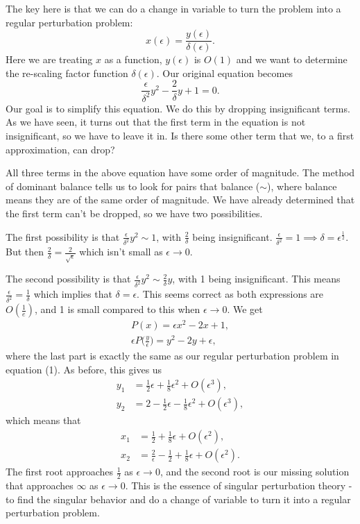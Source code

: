 \documentclass[12pt]{article}
\begin{document}
The key here is that we can do a change in variable to turn the
problem into a regular perturbation problem:
\begin{equation}
x(\epsilon) = \frac{y(\epsilon)}{\delta(\epsilon)}.
\end{equation}
Here we are treating $x$ as a function, $y(\epsilon)$ is $O(1)$ and we want to
determine the re-scaling factor function $\delta(\epsilon)$. Our original
equation becomes
\begin{equation}
\frac{\epsilon}{\delta^2} y^2 - \frac{2}{\delta} y + 1 = 0.
\end{equation}
Our goal is to simplify this equation. We do this by dropping
insignificant terms. As we have seen, it turns out that the first term
in the equation is not insignificant, so we have to leave it in. Is
there some other term that we, to a first approximation, can drop?

All three terms in the above equation have some order of
magnitude. The method of dominant balance tells us to look for pairs
that balance ($\sim$), where balance means they are of the same order
of magnitude. We have already determined that the first term can't be
dropped, so we have two possibilities.

The first possibility is that $\frac{\epsilon}{\delta^2} y^2 \sim 1$,
with $\frac{2}{\delta}$ being insignificant.
$\frac{\epsilon}{\delta^2} = 1 \implies \delta =
\epsilon^{\frac{1}{2}}$.
But then $\frac{2}{\delta} = \frac{2}{\sqrt{\epsilon}}$ which isn't
small as $\epsilon \to 0$.

The second possibility is that
$\frac{\epsilon}{\delta^2} y^2 \sim \frac{2}{\delta} y$, with 1 being
insignificant. This means
$\frac{\epsilon}{\delta^2} = \frac{1}{\delta}$ which implies that
$\delta = \epsilon$. This seems correct as both expressions are
$O(\frac{1}{e})$, and 1 is small compared to this when
$\epsilon \to 0$. We get
\begin{align}
P(x) = \epsilon x^2 - 2x + 1, \\
\epsilon P\Big(\frac{y}{\epsilon}\Big) = y^2 - 2 y + \epsilon,
\end{align}
where the last part is exactly the same as our regular perturbation
problem in equation (1). As before, this gives us
\begin{align}
y_1 &= \frac{1}{2} \epsilon + \frac{1}{8} \epsilon^2 + O(\epsilon^3), \\
y_2 &= 2 - \frac{1}{2} \epsilon - \frac{1}{8} \epsilon^2 + O(\epsilon^3),
\end{align}
which means that
\begin{align}
x_1 &= \frac{1}{2} + \frac{1}{8} \epsilon + O(\epsilon^2), \\
x_2 &= \frac{2}{\epsilon} - \frac{1}{2} + \frac{1}{8} \epsilon + O(\epsilon^2).
\end{align}
The first root approaches $\frac{1}{2}$ as $\epsilon \to 0$, and the
second root is our missing solution that approaches $\infty$ as
$\epsilon \to 0$. This is the essence of singular perturbation theory
- to find the singular behavior and do a change of variable to turn it
into a regular perturbation problem.
\end{document}
